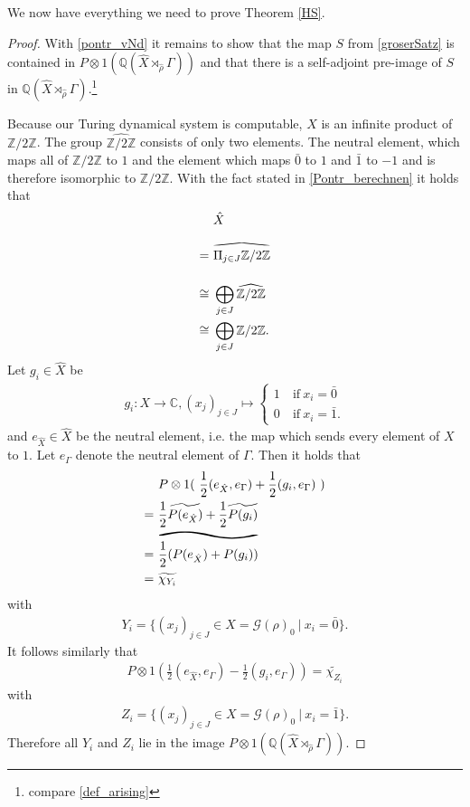 \documentclass[12pt,a4paper]{scrartcl}
\theoremstyle{plain}
\theoremstyle{definition}
\newcommand{\C}{\mathbb{C}} %
\newcommand{\Q}{\mathbb{Q}} %
\newcommand{\2}{\mathbb{Z} / 2 \mathbb{Z}}
\newcommand{\G}{\mathcal{G}}
\newcommand{\1}{\bar{1}}
\newcommand{\0}{\bar{0}}
\newcommand{\reallywidetilde}[1]{\ThisStyle{%
		\setbox0=\hbox{$\SavedStyle#1$}%
		\stackengine{-.1\LMpt}{$\SavedStyle#1$}{%
			\stretchto{\scaleto{\SavedStyle\mkern.2mu\AC}{.5150\wd0}}{.6\ht0}%
		}{O}{c}{F}{T}{S}%
}}
\newcommand{\reallywidehat}[1]{\arraycolsep=0pt\relax%
	\begin{array}{c}
		\stretchto{
			\scaleto{
				\scalerel*[\widthof{\ensuremath{#1}}]{\kern-.5pt\bigwedge\kern-.5pt}
				{\rule[-\textheight/2]{1ex}{\textheight}} %
			}{\textheight} %
		}{0.5ex}\\           %
		#1\\                 %
		\rule{-1ex}{0ex}
	\end{array}
}
\begin{document}
We now have everything we need to prove Theorem \ref{HS}.
\main*
\begin{proof}\label{image_of_P}
	With \ref{pontr_vNd} it remains to show that the map $S$ from \ref{groserSatz} is contained in $P \otimes 1(\Q (\hat{X} \rtimes_{\hat{\rho}} \Gamma))$ and that there is a self-adjoint pre-image of $S$ in $\Q (\hat{X} \rtimes_{\hat{\rho}} \Gamma)$.\footnote{compare \ref{def_arising}}
	
	Because our Turing dynamical system is computable, $X$ is an infinite product of $\2$. The group $\widehat{\2}$ consists of only two elements. The neutral element, which maps all of $\2$ to $1$ and the element which maps $\0$ to $1$ and $\1$ to $-1$ and is therefore isomorphic to $\2$. With the fact stated in \ref{Pontr_berechnen} it holds that 
	\begin{align*}
		 &~\hat{X} \\
		=&~ \reallywidehat{\Pi_{j \in J} \2} \\
		\cong&~ \bigoplus_{j \in J} \widehat{\2} \\
		\cong&~ \bigoplus_{j \in J} \2.
	\end{align*}
	Let $g_i \in \hat{X}$ be
	\begin{align*}
		g_i\colon X \to \C, (x_j)_{j \in J} \mapsto \begin{cases}
			1 &~ \text{if} \ x_i = \0 \\
			0 &~ \text{if} \ x_i = \1.
		\end{cases}
	\end{align*} 
	and $e_{\hat{X}} \in \hat{X}$ be the neutral element, i.e. the map which sends every element of $X$ to $1$. Let $e_{\Gamma}$ denote the neutral element of $\Gamma$. Then it holds that
	\begin{align*}
		 &~ P \otimes 1(~\frac{1}{2} (e_{\hat{X}}, e_{\Gamma}) + \frac{1}{2}(g_i, e_{\Gamma})~) \\
		=&~ \frac{1}{2} \widetilde{P(e_{\hat{X}})} + \frac{1}{2} \widetilde{P(g_i)} \\
		=&~ \reallywidetilde{\frac{1}{2}(P(e_{\hat{X}}) + P(g_i))} \\
		=&~ \widetilde{\chi_{Y_i}}
	\end{align*}
	with
	\begin{align*}
		Y_i = \{(x_j)_{j \in J} \in X = \G (\rho)_0~|~ x_i = \0\}.
	\end{align*} 
	It follows similarly that 
	\begin{align*}
		P \otimes 1(\frac{1}{2} (e_{\hat{X}}, e_{\Gamma}) - \frac{1}{2}(g_i, e_{\Gamma})) = \widetilde{\chi_{Z_i}}
	\end{align*}
	with
	\begin{align*}
		Z_i = \{(x_j)_{j \in J} \in X = \G (\rho)_0~|~ x_i = \1\}.
	\end{align*}
	Therefore all $Y_i$ and $Z_i$ lie in the image $P \otimes 1(\Q (\hat{X} \rtimes_{\hat{\rho}} \Gamma))$.
	

\end{proof}
\end{document}
